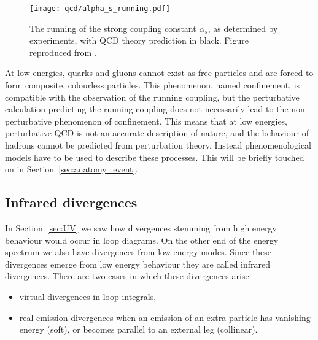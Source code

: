 \documentclass[main.tex]{subfiles}
\begin{document}
    \begin{figure}
        \texttt{[image: qcd/alpha\_s\_running.pdf]}
        \caption{The running of the strong coupling constant $\alpha_{s}$,
        as determined by experiments, with QCD theory prediction in black.
        Figure reproduced from \cite{Workman:2022ynf}.}
        \label{fig:alpha_s_running}
    \end{figure}

    At low energies, quarks and gluons cannot exist as free
    particles and are forced to form composite, colourless
    particles. This phenomenon, named confinement, is compatible
    with the observation of the running coupling, but the
    perturbative calculation predicting the running coupling
    does not necessarily lead to the non-perturbative phenomenon
    of confinement.
    This means that at low energies, perturbative QCD
    is not an accurate description of nature,
    and the behaviour of hadrons cannot be predicted
    from perturbation theory. Instead phenomenological
    models have to be used to describe these processes.
    This will be briefly touched on in Section~\ref{sec:anatomy_event}.
    
\subsection{Infrared divergences}\label{sec:IR_divergences}
    In Section~\ref{sec:UV} we saw how divergences
    stemming from high energy behaviour would occur
    in loop diagrams. On the other end of the energy
    spectrum we also have divergences from low energy
    modes. Since these divergences emerge from low energy
    behaviour they are called infrared divergences. There
    are two cases in which these divergences arise:
    \begin{itemize}
        \item virtual divergences in loop integrals,
        \item real-emission divergences when an emission
    of an extra particle has vanishing energy (soft),
    or becomes parallel to an external leg (collinear).
    \end{itemize}
\end{document}
